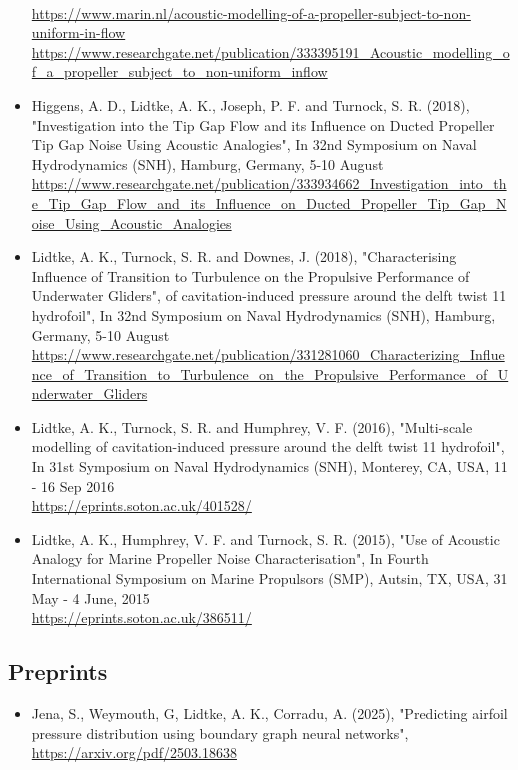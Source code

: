 \documentclass[a4paper,10pt]{article}
\begin{document}
\begin{itemize}
	\cite{Lidtke2019a}
	\\ \url{https://www.marin.nl/acoustic-modelling-of-a-propeller-subject-to-non-uniform-in-flow}
	\\ \url{https://www.researchgate.net/publication/333395191\_Acoustic\_modelling\_of\_a\_propeller\_subject\_to\_non-uniform\_inflow}
%
\item Higgens, A. D., Lidtke, A. K., Joseph, P. F. and Turnock, S. R. (2018),
	"Investigation into the Tip Gap Flow and its Influence on Ducted Propeller Tip Gap Noise Using Acoustic Analogies",
	In 32nd Symposium on Naval Hydrodynamics (SNH), Hamburg, Germany, 5-10 August
	\cite{Higgens2018}
	\\ \url{https://www.researchgate.net/publication/333934662\_Investigation\_into\_the\_Tip\_Gap\_Flow\_and\_its\_Influence\_on\_Ducted\_Propeller\_Tip\_Gap\_Noise\_Using\_Acoustic\_Analogies}
%
\item Lidtke, A. K., Turnock, S. R. and Downes, J. (2018),
	"Characterising Influence of Transition to Turbulence on the Propulsive Performance of Underwater Gliders",
	of cavitation-induced pressure around the delft twist 11 hydrofoil",
	In 32nd Symposium on Naval Hydrodynamics (SNH), Hamburg, Germany, 5-10 August
	\cite{Lidtke2018}
	\\ \url{https://www.researchgate.net/publication/331281060_Characterizing_Influence_of_Transition_to_Turbulence_on_the_Propulsive_Performance_of_Underwater_Gliders}
%
\item Lidtke, A. K., Turnock, S. R. and Humphrey, V. F. (2016), "Multi-scale modelling
	of cavitation-induced pressure around the delft twist 11 hydrofoil",
	In 31st Symposium on Naval Hydrodynamics (SNH), Monterey, CA, USA, 11 - 16 Sep 2016
	\cite{Lidtke2016b}
	\\ \url{https://eprints.soton.ac.uk/401528/}
%
\item Lidtke, A. K., Humphrey, V. F. and Turnock, S. R. (2015), "Use of Acoustic
	Analogy for Marine Propeller Noise Characterisation", In Fourth International
	Symposium on Marine Propulsors (SMP), Autsin, TX, USA, 31 May - 4 June, 2015
	\cite{Lidtke2015a}
	\\ \url{https://eprints.soton.ac.uk/386511/}
%
\end{itemize}

\subsection{Preprints}
%
\begin{itemize}
%
\item Jena, S., Weymouth, G, Lidtke, A. K., Corradu, A. (2025), "Predicting airfoil pressure distribution using boundary graph neural networks", 
	\cite{2025_jena_predicting}
	\\ \url{https://arxiv.org/pdf/2503.18638}
%
\end{itemize}
\end{document}
